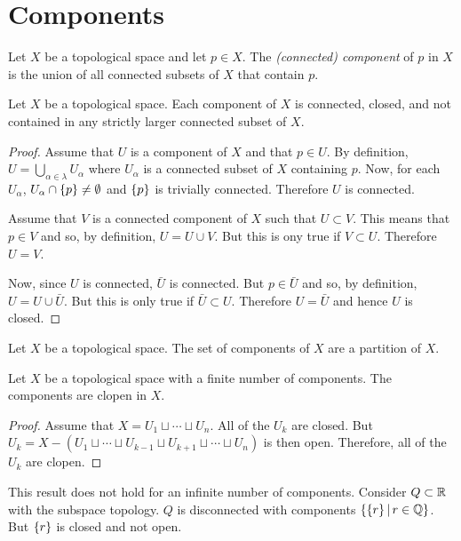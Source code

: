 \documentclass[letterpaper,12pt,fleqn]{article}
\renewcommand{\a}{\alpha}
\renewcommand{\l}{\lambda}
\begin{document}
\section*{Components}

\begin{definition}[Component]
  Let \(X\) be a topological space and let \(p\in X\).  The \emph{(connected) component} of \(p\) in \(X\) is the
  union of all connected subsets of \(X\) that contain \(p\).
\end{definition}

\begin{theorem}
  Let \(X\) be a topological space.  Each component of \(X\) is connected, closed, and not contained in any
  strictly larger connected subset of \(X\).
\end{theorem}

\begin{proof}
  Assume that \(U\) is a component of \(X\) and that \(p\in U\).  By definition, \(U=\bigcup_{\a\in\l}U_{\a}\)
  where \(U_{\a}\) is a connected subset of \(X\) containing \(p\).  Now, for each \(U_{\a}\),
  \(U_{\a}\cap\set{p}\ne\emptyset\) and \(\{p\}\) is trivially connected.  Therefore \(U\) is connected.

  Assume that \(V\) is a connected component of \(X\) such that \(U\subset V\).  This means that \(p\in V\) and
  so, by definition, \(U=U\cup V\).  But this is ony true if \(V\subset U\).  Therefore \(U=V\).

  Now, since \(U\) is connected, \(\bar{U}\) is connected.  But \(p\in\bar{U}\) and so, by definition,
  \(U=U\cup\bar{U}\).  But this is only true if \(\bar{U}\subset U\).  Therefore \(U=\bar{U}\) and hence \(U\) is
  closed.
\end{proof}

\begin{theorem}
  Let \(X\) be a topological space.  The set of components of \(X\) are a partition of \(X\).
\end{theorem}

\begin{theorem}
  Let \(X\) be a topological space with a finite number of components.  The components are clopen in \(X\).
\end{theorem}

\begin{proof}
  Assume that \(X=U_1\sqcup\cdots\sqcup U_n\).  All of the \(U_k\) are closed.  But
  \(U_k=X-(U_1\sqcup\cdots\sqcup U_{k-1}\sqcup U_{k+1}\sqcup\cdots\sqcup U_n)\) is then open.  Therefore, all of the
  \(U_k\) are clopen.
\end{proof}

This result does not hold for an infinite number of components.  Consider \(Q\subset\mathbb{R}\) with the subspace
topology.  \(Q\) is disconnected with components \(\left\{{\{r\}}\,\middle|\,{r\in\mathbb{Q}}\right\}\).  But \(\{r\}\) is closed and not
open.
\end{document}
